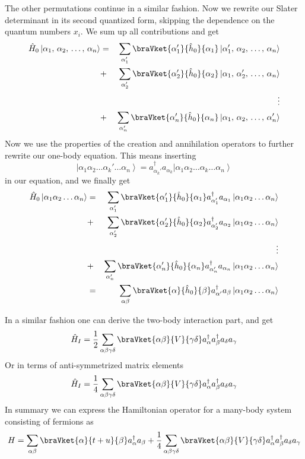 \normalsize
The other permutations continue in a similar fashion. Now we rewrite our Slater determinant in its second quantized form, skipping the dependence on the quantum numbers $x_{i}$. We sum up all contributions and get
\begin{eqnarray*}
	\hat{H}_{0}\left|\alpha_{1},\,\alpha_{2},\,\dots,\,\alpha_{n}\right\rangle  & = & \sum_{\alpha_{1}'}\braVket{\alpha_{1}'}{\hat{h}_{0}}{\alpha_{1}}\left|\alpha_{1}',\,\alpha_{2},\,\dots,\,\alpha_{n}\right\rangle \\
	 & + & \sum_{\alpha_{2}'}\braVket{\alpha_{2}'}{\hat{h}_{0}}{\alpha_{2}}\left|\alpha_{1},\,\alpha_{2}',\,\dots,\,\alpha_{n}\right\rangle \\
	 &  & \vdots\\
	 & + & \sum_{\alpha_{n}'}\braVket{\alpha_{n}'}{\hat{h}_{0}}{\alpha_{n}}\left|\alpha_{1},\,\alpha_{2},\,\dots,\,\alpha_{n}'\right\rangle 
\end{eqnarray*}
Now we use the properties of the creation and annihilation operators to further rewrite our one-body equation. This means inserting
\[
	\left|\alpha_{1}\alpha_{2}\dots\alpha_{k}'\dots\alpha_{n}\right\rangle = a_{\alpha_{k}'}^{\dagger}a_{\alpha_{k}} \left|\alpha_{1}\alpha_{2}\dots\alpha_{k}\dots\alpha_{n}\right\rangle 
\]
in our equation, and we finally get
\begin{eqnarray*}
	\hat{H}_{0}\left|\alpha_{1}\alpha_{2}\dots\alpha_{n}\right\rangle  & = & \sum_{\alpha_{1}'}\braVket{\alpha_{1}'}{\hat{h}_{0}}{\alpha_{1}}a_{\alpha_{1}'}^{\dagger}a_{\alpha_{1}}\left|\alpha_{1}\alpha_{2}\dots\alpha_{n}\right\rangle \\
	 & + & \sum_{\alpha_{2}'}\braVket{\alpha_{2}'}{\hat{h}_{0}}{\alpha_{2}}a_{\alpha_{2}'}^{\dagger}a_{\alpha_{2}}\left|\alpha_{1}\alpha_{2}\dots\alpha_{n}\right\rangle \\
	 &  & \vdots\\
	 & + & \sum_{\alpha_{n}'}\braVket{\alpha_{n}'}{\hat{h}_{0}}{\alpha_{n}}a_{\alpha_{n}'}^{\dagger}a_{\alpha_{n}}\left|\alpha_{1}\alpha_{2}\dots\alpha_{n}\right\rangle \\
	 & = & \sum_{\alpha\beta}\braVket{\alpha}{\hat{h}_{0}}{\beta}a_{\alpha'}^{\dagger}a_{\beta}\left|\alpha_{1}\alpha_{2}\dots\alpha_{n}\right\rangle 
\end{eqnarray*}

In a similar fashion one can derive the two-body interaction part, and get
\[
	\hat{H}_{I}=\frac{1}{2}\sum_{\alpha\beta\gamma\delta}\braVket{\alpha\beta}{V}{\gamma\delta}a_{\alpha}^{\dagger}a_{\beta}^{\dagger}a_{\delta}a_{\gamma}
\]
Or in terms of anti-symmetrized matrix elements
\[
	\hat{H}_{I}=\frac{1}{4}\sum_{\alpha\beta\gamma\delta}\braVket{\alpha\beta}{V}{\gamma\delta}a_{\alpha}^{\dagger}a_{\beta}^{\dagger}a_{\delta}a_{\gamma}
\]
In summary we can express the Hamiltonian operator for a many-body system consisting of fermions as 
\[
	H=\sum_{\alpha\beta}\braVket{\alpha}{t+u}{\beta}a_{\alpha}^{\dagger}a_{\beta}+\frac{1}{4}\sum_{\alpha\beta\gamma\delta}\braVket{\alpha\beta}{V}{\gamma\delta}a_{\alpha}^{\dagger}a_{\beta}^{\dagger}a_{\delta}a_{\gamma}
\]


